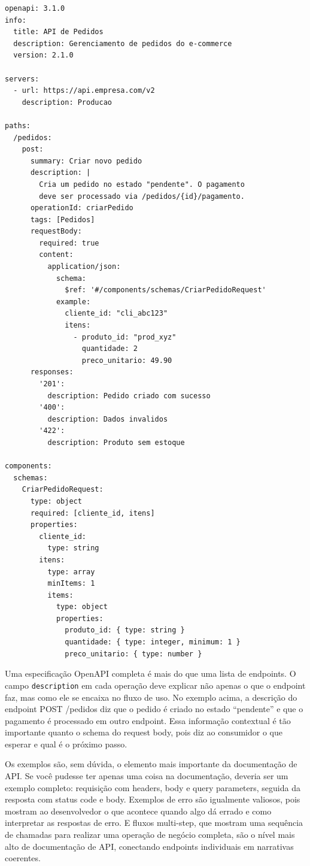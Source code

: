 \begin{lstlisting}[language={}, caption={Exemplo de Especificação OpenAPI (YAML)}]
openapi: 3.1.0
info:
  title: API de Pedidos
  description: Gerenciamento de pedidos do e-commerce
  version: 2.1.0

servers:
  - url: https://api.empresa.com/v2
    description: Producao

paths:
  /pedidos:
    post:
      summary: Criar novo pedido
      description: |
        Cria um pedido no estado "pendente". O pagamento
        deve ser processado via /pedidos/{id}/pagamento.
      operationId: criarPedido
      tags: [Pedidos]
      requestBody:
        required: true
        content:
          application/json:
            schema:
              $ref: '#/components/schemas/CriarPedidoRequest'
            example:
              cliente_id: "cli_abc123"
              itens:
                - produto_id: "prod_xyz"
                  quantidade: 2
                  preco_unitario: 49.90
      responses:
        '201':
          description: Pedido criado com sucesso
        '400':
          description: Dados invalidos
        '422':
          description: Produto sem estoque

components:
  schemas:
    CriarPedidoRequest:
      type: object
      required: [cliente_id, itens]
      properties:
        cliente_id:
          type: string
        itens:
          type: array
          minItems: 1
          items:
            type: object
            properties:
              produto_id: { type: string }
              quantidade: { type: integer, minimum: 1 }
              preco_unitario: { type: number }
\end{lstlisting}

Uma especificação OpenAPI completa é mais do que uma lista de endpoints.
O campo \texttt{description} em cada operação deve explicar não apenas
o que o endpoint faz, mas como ele se encaixa no fluxo de uso. No
exemplo acima, a descrição do endpoint POST /pedidos diz que o pedido
é criado no estado ``pendente'' e que o pagamento é processado em outro
endpoint. Essa informação contextual é tão importante quanto o schema
do request body, pois diz ao consumidor o que esperar e qual é o
próximo passo.

Os exemplos são, sem dúvida, o elemento mais importante da
documentação de API. Se você pudesse ter apenas uma coisa na
documentação, deveria ser um exemplo completo: requisição com headers,
body e query parameters, seguida da resposta com status code e body.
Exemplos de erro são igualmente valiosos, pois mostram ao desenvolvedor
o que acontece quando algo dá errado e como interpretar as respostas
de erro. E fluxos multi-step, que mostram uma sequência de chamadas
para realizar uma operação de negócio completa, são o nível mais alto
de documentação de API, conectando endpoints individuais em narrativas
coerentes.



